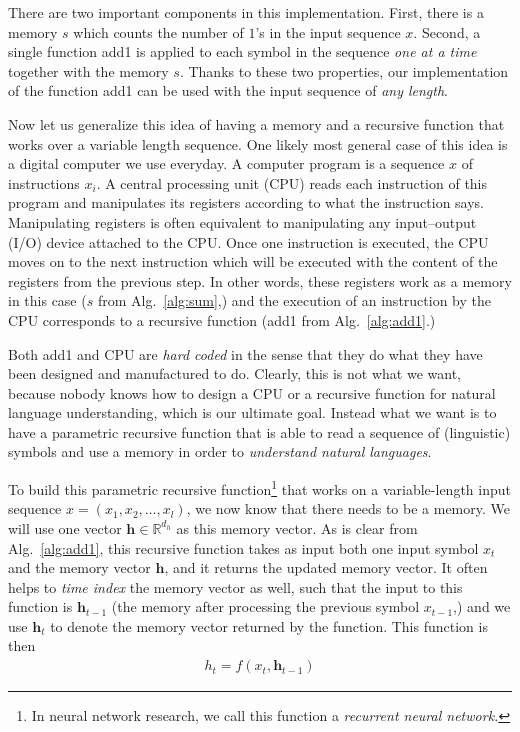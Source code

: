 \documentclass{report}
\newcommand{\vect}[1]{\mathbf{#1}}
\newcommand{\vh}[0]{\vect{h}}
\newcommand{\RR}[0]{\mathbb{R}}
\begin{document}
There are two important components in this implementation. First, there is a
memory $s$ which counts the number of $1$'s in the input sequence $x$. Second,
a single function {\sc add1} is applied to each symbol in the sequence {\em one
at a time} together with the memory $s$. Thanks to these two properties, our
implementation of the function {\sc add1} can be used with the input sequence of
{\em any length}.

Now let us generalize this idea of having a memory and a recursive function that
works over a variable length sequence. One likely most general case of this idea
is a digital computer we use everyday. A computer program is a sequence $x$ of
instructions $x_i$. A central processing unit (CPU) reads each instruction of
this program and manipulates its registers according to what the instruction
says. Manipulating registers is often equivalent to manipulating any
input--output (I/O) device attached to the CPU. Once one instruction is
executed, the CPU moves on to the next instruction which will be executed with
the content of the registers from the previous step. In other words, these
registers work as a memory in this case ($s$ from Alg.~\ref{alg:sum},) and the
execution of an instruction by the CPU corresponds to a recursive function
({\sc add1} from Alg.~\ref{alg:add1}.)

Both {\sc add1} and CPU are {\em hard coded} in the sense that they do what they
have been designed and manufactured to do. Clearly, this is not what we want,
because nobody knows how to design a CPU or a recursive function for natural
language understanding, which is our ultimate goal. Instead what we want is to
have a parametric recursive function that is able to read a sequence of
(linguistic) symbols and use a memory in order to {\em understand natural
languages}.

To build this parametric recursive function\footnote{
    In neural network research, we call this function a {\em recurrent neural
    network.}
}
that works on a variable-length
input sequence $x=(x_1, x_2, \ldots, x_l)$, we now know that there needs to be a
memory. We will use one vector $\vh \in \RR^{d_h}$ as this memory vector. As is
clear from Alg.~\ref{alg:add1}, this recursive function takes as input both one
input symbol $x_t$ and the memory vector $\vh$, and it returns the updated memory
vector. It often helps to {\em time index} the memory vector as well, such that
the input to this function is $\vh_{t-1}$ (the memory after processing the
previous symbol $x_{t-1}$,) and we use $\vh_t$ to denote the memory vector
returned by the function. This function is then
\begin{align*}
    h_t = f(x_t, \vh_{t-1})
\end{align*}
\end{document}
